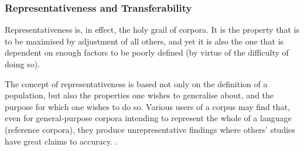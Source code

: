 







\subsubsection{Representativeness and Transferability}
Representativeness is, in effect, the holy grail of corpora.  It is the property that is to be maximised by adjustment of all others, and yet it is also the one that is dependent on enough factors to be poorly defined (by virtue of the difficulty of doing so).

The concept of representativeness is based not only on the definition of a population, but also the properties one wishes to generalise about, and the purpose for which one wishes to do so.  Various users of a corpus may find that, even for general-purpose corpora intending to represent the whole of a language (reference corpora), they produce unrepresentative findings where others' studies have great claims to accuracy. .

